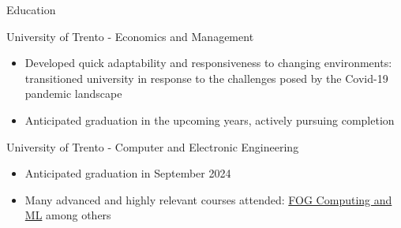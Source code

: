 \documentclass{article}
\newlength{\tabin}
\newlength{\secsep}
\newcommand{\lineunder}{\vspace*{-8pt} \\ \hspace*{-6pt} \hrulefill \\ \vspace*{-15pt}}
\newenvironment{tabbedsection}[1]{
  \begin{list}{}{
      \setlength{\itemsep}{0pt}
      \setlength{\labelsep}{0pt}
      \setlength{\labelwidth}{0pt}
      \setlength{\leftmargin}{\tabin}
      \setlength{\rightmargin}{\tabin}
      \setlength{\listparindent}{0pt}
      \setlength{\parsep}{0pt}
      \setlength{\parskip}{0pt}
      \setlength{\partopsep}{0pt}
      \setlength{\topsep}{#1}
    }
  \item[]
}{\end{list}}
\newenvironment{resume_section}[1]{
  \filbreak
  \vspace{2\secsep}
  \textbf{\textsc{\Large#1}}
  \lineunder
  \begin{tabbedsection}{\secsep}
}{\end{tabbedsection}}
\newenvironment{resume_subsection}[2][]{
  \textbf{#2} \hfill {\footnotesize #1} \hspace{2em}
  \begin{tabbedsection}{0.5\secsep}
}{\end{tabbedsection}}
\newenvironment{subitems}{
  \renewcommand{\labelitemi}{$\bullet$} %
  \begin{itemize}
      \setlength{\labelsep}{1em}
}{\end{itemize}}
\begin{document}
\begin{resume_section}{Education}

  \begin{resume_subsection}[Trento, IT (2019 - 2021)]{University of Trento - Economics and Management}
    \begin{subitems}
      \item Developed quick adaptability and responsiveness to changing environments: transitioned university in response to the challenges posed by the Covid-19 pandemic landscape
      \item Anticipated graduation in the upcoming years, actively pursuing completion
    \end{subitems}
  \end{resume_subsection}

  \begin{resume_subsection}{University of Trento - Computer and Electronic Engineering}
    \begin{subitems}
      \item Anticipated graduation in September 2024
      \item Many advanced and highly relevant courses attended: \underline{FOG Computing and ML} among others
    \end{subitems}
  \end{resume_subsection}

\end{resume_section}
\end{document}
